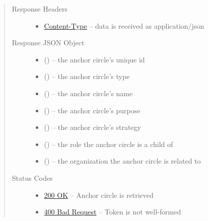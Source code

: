 \documentclass[letterpaper,10pt,english]{sphinxmanual}
\begin{document}
\begin{fulllineitems}
\begin{quote}
\begin{description}
\begin{itemize}
\end{itemize}

\item[{Response Headers}] \leavevmode\begin{itemize}
\item {} 
\href{http://tools.ietf.org/html/rfc7231\#section-3.1.1.5}{Content-Type} -- data is received as application/json

\end{itemize}

\item[{Response JSON Object}] \leavevmode\begin{itemize}
\item {} 
 () -- the anchor circle's unique id

\item {} 
 () -- the anchor circle's type

\item {} 
 () -- the anchor circle's name

\item {} 
 () -- the anchor circle's purpose

\item {} 
 () -- the anchor circle's strategy

\item {} 
 () -- the role the anchor circle is a child of

\item {} 
 () -- the organization the anchor circle is
related to

\end{itemize}

\item[{Status Codes}] \leavevmode\begin{itemize}
\item {} 
\href{http://www.w3.org/Protocols/rfc2616/rfc2616-sec10.html\#sec10.2.1}{200 OK} -- Anchor circle is retrieved

\item {} 
\href{http://www.w3.org/Protocols/rfc2616/rfc2616-sec10.html\#sec10.4.1}{400 Bad Request} -- Token is not well-formed


\end{itemize}
\end{description}
\end{quote}
\end{fulllineitems}
\end{document}
